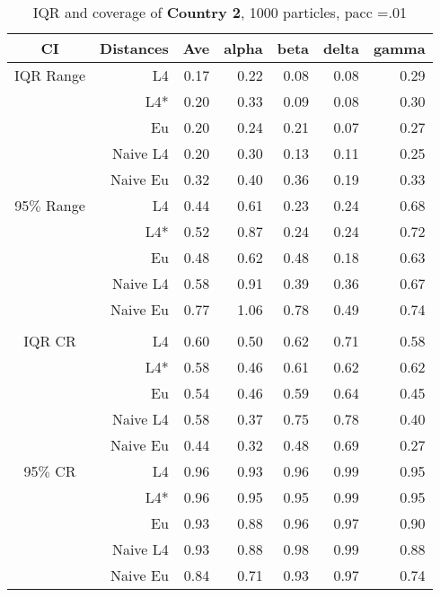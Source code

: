 \documentclass[a4paper,12pt,twoside]{book}
\begin{document}
\begin{table}[H]
\centering
\caption{IQR and coverage of \textbf{Country 2}, 1000 particles, pacc =.01}

\begin{tabular}{crrrrrr}
  \hline
{\color{blue}CI} & Distances & Ave & alpha & beta & delta & gamma \\ 
  \hline
{\color{blue}IQR Range}& L4  &0.17 & 0.22 & 0.08 & 0.08 & 0.29 \\ 
  
 &L4*  &0.20 & 0.33 & 0.09 & 0.08 & 0.30 \\ 
  
&Eu &      0.20 & 0.24 & 0.21 & 0.07 & 0.27 \\ 
  
&Naive L4& 0.20 & 0.30 & 0.13 & 0.11 & 0.25 \\ 
  
&Naive Eu &   0.32 & 0.40 & 0.36 & 0.19 & 0.33 \\ 
  
    {\color{blue}95$\%$ Range} & L4  &0.44 & 0.61 & 0.23 & 0.24 & 0.68 \\ 
 
    &L4*  &   0.52 & 0.87 & 0.24 & 0.24 & 0.72 \\ 
 
&Eu &   0.48 & 0.62 & 0.48 & 0.18 & 0.63 \\ 
 
&Naive L4&   0.58 & 0.91 & 0.39 & 0.36 & 0.67 \\
&Naive Eu &     0.77 & 1.06 & 0.78 & 0.49 & 0.74 \\ 
  
     \\
   \hline
   
{\color{blue} IQR CR } & L4  &0.60 & 0.50 & 0.62 & 0.71 & 0.58 \\ 
  
&L4*  & 0.58 & 0.46 & 0.61 & 0.62 & 0.62 \\ 
   
&Eu &   0.54 & 0.46 & 0.59 & 0.64 & 0.45 \\ 
 
&Naive L4&  0.58 & 0.37 & 0.75 & 0.78 & 0.40 \\
  
&Naive Eu &   0.44 & 0.32 & 0.48 & 0.69 & 0.27 \\ 
  

 {\color{blue} 95$\%$ CR } & L4  &0.96 & 0.93 & 0.96 & 0.99 & 0.95 \\ 
  
 &L4*  &  0.96 & 0.95 & 0.95 & 0.99 & 0.95 \\ 
   
&Eu &  0.93 & 0.88 & 0.96 & 0.97 & 0.90 \\ 
 
&Naive L4&  
  0.93 & 0.88 & 0.98 & 0.99 & 0.88 \\
&Naive Eu &     0.84 & 0.71 & 0.93 & 0.97 & 0.74 \\ 
  
\end{tabular}

\end{table}
\end{document}
